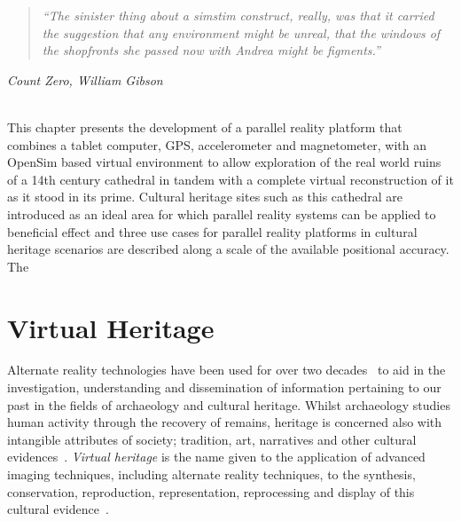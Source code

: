 \begin{quote}
	\textit{``The sinister thing about a simstim construct, really, was that it carried the suggestion that any environment might be unreal, that the windows of the shopfronts she passed now with Andrea might be figments.''}
\end{quote}
\hfill \textit{Count Zero, William Gibson}
\\
\\


\label{chapter-vtw}

This chapter presents the development of a parallel reality platform that combines a tablet computer, GPS, accelerometer and magnetometer, with an OpenSim based virtual environment to allow exploration of the real world ruins of a 14th century cathedral in tandem with a complete virtual reconstruction of it as it stood in its prime. Cultural heritage sites such as this cathedral are introduced as an ideal area for which parallel reality systems can be applied to beneficial effect and three use cases for parallel reality platforms in cultural heritage scenarios are described along a scale of the available positional accuracy. The


\section{Virtual Heritage}

Alternate reality technologies have been used for over two decades~\cite{Roussou2002} to aid in the investigation, understanding and dissemination of information pertaining to our past in the fields of archaeology and cultural heritage. Whilst archaeology studies human activity through the recovery of remains, heritage is concerned also with intangible attributes of society; tradition, art, narratives and other cultural evidences~\cite{Roussou2002}. \textit{Virtual heritage} is the name given to the application of advanced imaging techniques, including alternate reality techniques, to the synthesis, conservation, reproduction, representation, reprocessing and display of this cultural evidence~\cite{roussou:photorealism}.

